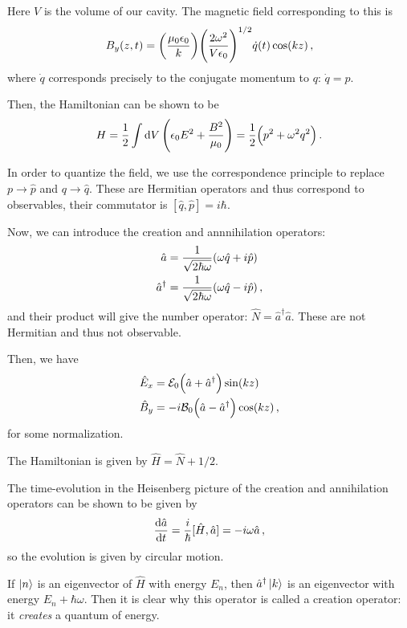\documentclass[main.tex]{subfiles}
\begin{document}
Here \(V\) is the volume of our cavity. The magnetic field corresponding to this is 
%
\begin{align}
B_y (z, t) = \qty(\frac{\mu_0 \epsilon_0  }{k}) \qty(\frac{2 \omega^2}{V \epsilon_0 })^{1/2} \dot{q}(t) \cos(kz)
\,,
\end{align}
%
where \(\dot{q}\) corresponds precisely to the conjugate momentum to \(q\): \(\dot{q} = p\). 

Then, the Hamiltonian can be shown to be 
%
\begin{align}
H =\frac{1}{2} \int \dd{V} \qty(\epsilon_0 E^2 + \frac{B^2}{\mu_0 }) 
= \frac{1}{2} \qty(p^2 + \omega^2 q^2)
\,.
\end{align}

In order to quantize the field, we use the correspondence principle to replace \(p \rightarrow \hat{p}\) and \(q \rightarrow \hat{q}\). These are Hermitian operators and thus correspond to observables, their commutator is \([\hat{q}, \hat{p}] = i \hbar\). 

Now, we can introduce the creation and annnihilation operators: 
%
\begin{align}
\hat{a} &= \frac{1}{\sqrt{2 \hbar \omega }} \qty(\omega \hat{q} + i \hat{p})  \\
\hat{a}^\dag &= \frac{1}{\sqrt{2 \hbar \omega }} \qty(\omega \hat{q} - i \hat{p})  
\,,
\end{align}
%
and their product will give the number operator: \(\hat{N} = \hat{a}^\dag \hat{a}\). These are not Hermitian and thus not observable. 

Then, we have 
%
\begin{align}
\hat{E}_{x} &= \mathcal{E}_{0} \qty(\hat{a} + \hat{a}^\dag) \sin(kz) \\
\hat{B}_{y} &= -i \mathcal{B}_{0} \qty(\hat{a} - \hat{a}^\dag) \cos(kz)
\,,
\end{align}
%
for some normalization.

The Hamiltonian is given by \(\hat{H} = \hat{N} + 1/2\). 

The time-evolution in the Heisenberg picture of the creation and annihilation operators can be shown to be given by 
%
\begin{align}
\dv{\hat{a} }{t} = \frac{i}{\hbar} [\hat{H}, \hat{a}] = - i \omega \hat{a}
\,,
\end{align}
%
so the evolution is given by circular motion. 

If \(\ket{n} \) is an eigenvector of \(\hat{H}\) with energy \(E_n\), then \(\hat{a}^\dag \ket{k} \) is an eigenvector with energy \(E_n + \hbar \omega \). Then it is clear why this operator is called a creation operator: it \emph{creates} a quantum of energy. 
\end{document}
